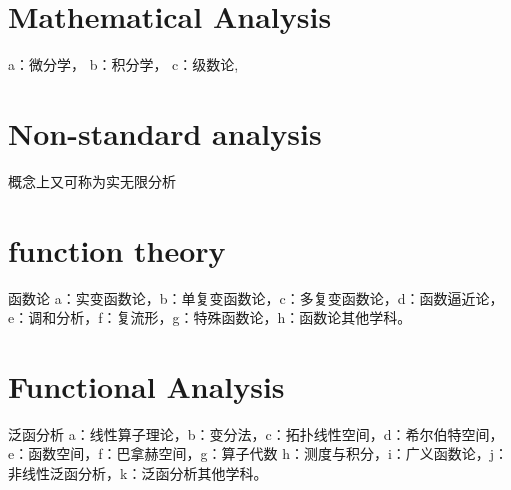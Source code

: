 

\chapter{Mathematical Analysis}


a：微分学，
b：积分学，
c：级数论,



\chapter{Non-standard analysis}

概念上又可称为实无限分析


\chapter{function theory}
函数论
a：实变函数论，b：单复变函数论，c：多复变函数论，d：函数逼近论，e：调和分析，f：复流形，g：特殊函数论，h：函数论其他学科。



\chapter{Functional Analysis}

泛函分析
a：线性算子理论，b：变分法，c：拓扑线性空间，d：希尔伯特空间，e：函数空间，f：巴拿赫空间，g：算子代数 h：测度与积分，i：广义函数论，j：非线性泛函分析，k：泛函分析其他学科。

